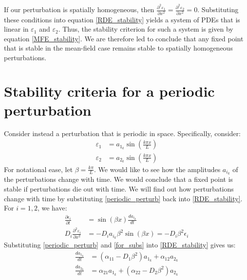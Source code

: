 If our perturbation is spatially homogeneous, then $\frac{\partial^2\varepsilon_1}{\partial x^2} = \frac{\partial^2\varepsilon_2}{\partial x^2} = 0$. Substituting these conditions into equation \eqref{RDE_stability} yields a system of PDEs that is linear in $\varepsilon_1$ and $\varepsilon_2$. Thus, the stability criterion for such a system is given by equation \eqref{MFE_stability}. We are therefore led to conclude that any fixed point that is stable in the mean-field case remains stable to spatially homogeneous perturbations.
\bigskip
\section{Stability criteria for a periodic perturbation}
Consider instead a perturbation that is periodic in space. Specifically, consider:
\begin{equation}
	\label{periodic_perturb}
	\begin{aligned}
		\varepsilon_1 &= a_{1_k}\sin(\frac{k\pi x}{L})\\
		\varepsilon_2 &= a_{2_k}\sin(\frac{k\pi x}{L})
	\end{aligned}
\end{equation}
For notational ease, let $\beta = \frac{k\pi}{L}$. We would like to see how the amplitudes $a_{i_k}$ of the perturbations change with time. We would conclude that a fixed point is stable if perturbations die out with time. We will find out how perturbations change with time by substituting \eqref{periodic_perturb} back into \eqref{RDE_stability}. For $i = 1,2$, we have:
\begin{equation}
	\label{for_subs}
	\begin{aligned}
		\frac{\partial \epsilon_i}{\partial t} &= \sin(\beta x)\frac{da_{i_k}}{dt}\\
		D_{i}\frac{\partial^2\varepsilon_i}{\partial x^2} &= -D_{i}a_{i_{k}}\beta^{2}\sin(\beta x)=-D_i\beta^2\epsilon_i
	\end{aligned}
\end{equation}
Substituting \eqref{periodic_perturb} and \eqref{for_subs} into \eqref{RDE_stability} gives us:
\begin{equation}
	\label{periodic_linearized}
	\begin{aligned}
		\frac{da_{1_k}}{dt} &= (\alpha_{11} - D_1\beta^2)a_{1_k} + \alpha_{12}a_{2_k}\\
		\frac{da_{2_k}}{dt} &= \alpha_{21}a_{1_k} + (\alpha_{22} - D_2\beta^2)a_{2_k}
	\end{aligned}
\end{equation}
